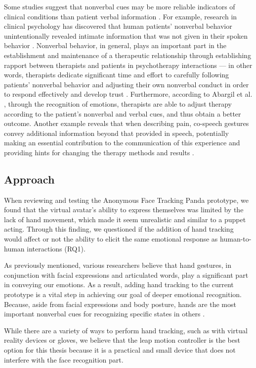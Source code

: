 Some studies suggest that nonverbal cues may be more reliable indicators of clinical conditions than patient verbal information \cite{KNA13}. For example, research in clinical psychology has discovered that human patients' nonverbal behavior unintentionally revealed intimate information that was not given in their spoken behavior \cite{FAB06, KLE03}. Nonverbal behavior, in general, plays an important part in the establishment and maintenance of a therapeutic relationship through establishing rapport between therapists and patients in psychotherapy interactions \cite{KLE03} — in other words, therapists dedicate significant time and effort to carefully following patients' nonverbal behavior and adjusting their own nonverbal conduct in order to respond effectively and develop trust \cite{ABA21}. Furthermore, according to Abargil et al. \cite{ABA21}, through the recognition of emotions, therapists are able to adjust therapy according to the patient's nonverbal and verbal cues, and thus obtain a better outcome. Another example reveals that when describing pain, co-speech gestures convey additional information beyond that provided in speech, potentially making an essential contribution to the communication of this experience and providing hints for changing the therapy methods and results \cite{ROW16, REI22}.

\subsection{Approach}

When reviewing and testing the Anonymous Face Tracking Panda prototype, we found that the virtual avatar's ability to express themselves was limited by the lack of hand movement, which made it seem unrealistic and similar to a puppet acting. Through this finding, we questioned if the addition of hand tracking would affect or not the ability to elicit the same emotional response as human-to-human interactions (RQ1).

As previously mentioned, various researchers believe that hand gestures, in conjunction with facial expressions and articulated words, play a significant part in conveying our emotions. As a result, adding hand tracking to the current prototype is a vital step in achieving our goal of deeper emotional recognition. Because, aside from facial expressions and body posture, hands are the most important nonverbal cues for recognizing specific states in others \cite{WAX97, REI22}.

While there are a variety of ways to perform hand tracking, such as with virtual reality devices or gloves, we believe that the leap motion controller is the best option for this thesis because it is a practical and small device that does not interfere with the face recognition part.

